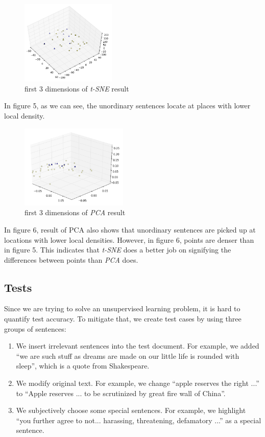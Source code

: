 \documentclass[conference,compsoc]{IEEEtran}
\begin{document}
  \begin{figure}[h!]
  \centering
          \includegraphics[height=4cm]{tsne_report.png}
      \caption{first 3 dimensions of \emph{t-SNE} result}
      \label{fig:verticalcell}
  \end{figure}  

  In figure 5, as we can see, the unordinary sentences locate at places with lower local density. 

  \begin{figure}[h!]
  \centering
          \includegraphics[height=4cm]{PCA_result.png}
      \caption{first 3 dimensions of \emph{PCA} result}
      \label{fig:verticalcell}
  \end{figure}  

  In figure 6, result of PCA also shows that unordinary sentences are picked up at locations with lower local densities. However, in figure 6, points are denser than in figure 5. This indicates that \emph{t-SNE} does a better job on signifying the differences between points than \emph{PCA} does. 

  \subsection{Tests}
  Since we are trying to solve an unsupervised learning problem, it is hard to quantify test accuracy. To mitigate that, we create test cases by using three groups of sentences:
  \begin{enumerate}
    \item We insert irrelevant sentences into the test document. For example, we added ``we are such stuff as dreams are made on our little life is rounded with sleep'', which is a quote from Shakespeare. 

    \item We modify original text. For example, we change ``apple reserves the right ...'' to ``Apple reserves ... to be scrutinized by great fire wall of China''.

    \item We subjectively choose some special sentences. For example, we highlight ``you further agree to not... harassing, threatening, defamatory ...'' as a special sentence. 
  \end{enumerate}
\end{document}
